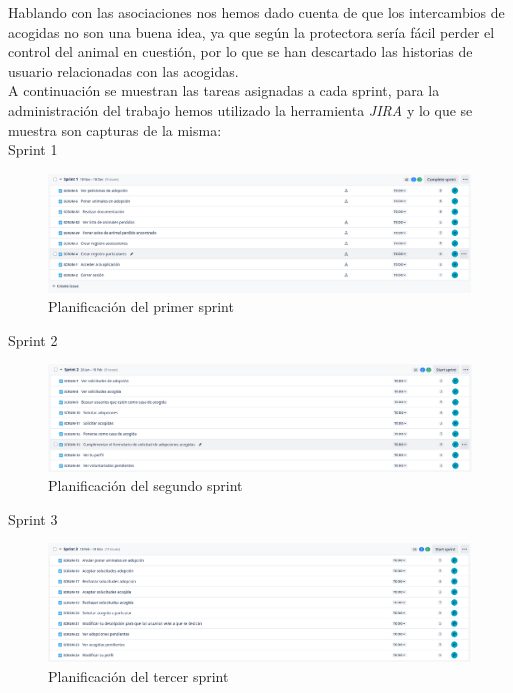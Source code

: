 Hablando con las asociaciones nos hemos dado cuenta de que los intercambios de acogidas no son una buena idea, ya que según la protectora sería fácil perder el control del animal en cuestión, por lo que se han descartado las historias de usuario relacionadas con las acogidas. \\

A continuación se muestran las tareas asignadas a cada sprint, para la administración del trabajo hemos utilizado la herramienta \textit{JIRA} y lo que se muestra son capturas de la misma: \\

Sprint 1 \\ 
\begin{figure}[H]
	\centering
	\includegraphics[width=1\linewidth]{screenshot001}
	\caption{Planificación del primer sprint}
	\label{fig:sprint1}
\end{figure}


Sprint 2 \\
\begin{figure}[H]
	\centering
	\includegraphics[width=1\linewidth]{screenshot002}
	\caption{Planificación del segundo sprint}
	\label{fig:sprint2}
\end{figure} 


Sprint 3 \\ 
\begin{figure}[H]
	\centering
	\includegraphics[width=1\linewidth]{sprint3}
	\caption{Planificación del tercer sprint}
	\label{fig:sprint3}
\end{figure}

